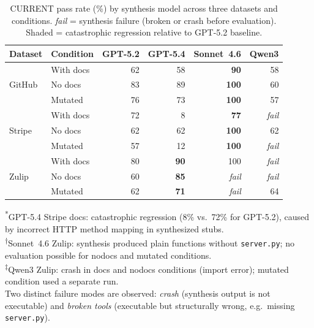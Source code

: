 \begin{table}[htbp]
\centering
\caption{CURRENT pass rate (\%) by synthesis model across three datasets and conditions.
\textit{fail} = synthesis failure (broken or crash before evaluation).
\colorbox{red!12}{Shaded} = catastrophic regression relative to GPT-5.2 baseline.}
\label{tab:synth-model}
\small
\begin{tabular}{ll rrrr}
\toprule
\textbf{Dataset} & \textbf{Condition} &
  \textbf{GPT-5.2} & \textbf{GPT-5.4} & \textbf{Sonnet~4.6} & \textbf{Qwen3} \\
\midrule
\multirow{3}{*}{GitHub}
  & With docs    &  62 &  58 & \textbf{90} &  58 \\
  & No docs      &  83 &  89 & \textbf{100} & 60 \\
  & Mutated      &  76 &  73 & \textbf{100} & 57 \\
\midrule
\multirow{3}{*}{Stripe}
  & With docs    &  72 & \cellcolor{red!12}8\rlap{\textsuperscript{*}} & \textbf{77} & \textit{fail} \\
  & No docs      &  62 &  62 & \textbf{100} &  62 \\
  & Mutated      &  57 & \cellcolor{red!12}12 & \textbf{100} & \textit{fail} \\
\midrule
\multirow{3}{*}{Zulip}
  & With docs    &  80 & \textbf{90} & 100\rlap{\textsuperscript{†}} & \textit{fail}\rlap{\textsuperscript{‡}} \\
  & No docs      &  60 & \textbf{85} & \textit{fail}\rlap{\textsuperscript{†}} & \textit{fail}\rlap{\textsuperscript{‡}} \\
  & Mutated      &  62 & \textbf{71} & \textit{fail}\rlap{\textsuperscript{†}} & 64 \\
\bottomrule
\end{tabular}

\smallskip
\raggedright\footnotesize
\textsuperscript{*}GPT-5.4 Stripe docs: catastrophic regression (8\% vs.\ 72\% for GPT-5.2),
caused by incorrect HTTP method mapping in synthesized stubs.\\
\textsuperscript{†}Sonnet~4.6 Zulip: synthesis produced plain functions without \texttt{server.py};
no evaluation possible for nodocs and mutated conditions.\\
\textsuperscript{‡}Qwen3 Zulip: crash in docs and nodocs conditions (import error);
mutated condition used a separate run.\\
Two distinct failure modes are observed: \emph{crash} (synthesis output is not executable)
and \emph{broken tools} (executable but structurally wrong, e.g.\ missing \texttt{server.py}).
\end{table}
